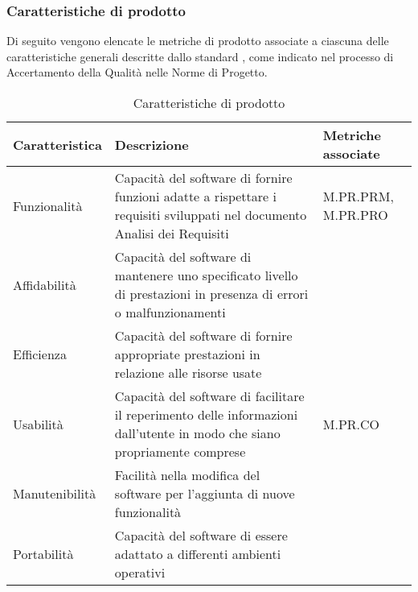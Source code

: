 \subsubsection{Caratteristiche di prodotto}
Di seguito vengono elencate le metriche di prodotto associate a ciascuna delle caratteristiche generali descritte dallo standard , 
come indicato nel processo di Accertamento della Qualità nelle Norme di Progetto.
\begin{table}[H]
    \centering
    \begin{tabularx}{\textwidth}{| X | X | X |}
    \hline
        \textbf{Caratteristica} & 
        \textbf{Descrizione} &
        \textbf{Metriche associate}\\
    \hline
        Funzionalità & Capacità del software di fornire funzioni adatte a rispettare i requisiti sviluppati nel documento Analisi dei Requisiti & M.PR.PRM, M.PR.PRO \\
    \hline
        Affidabilità & Capacità del software di mantenere uno specificato livello di prestazioni in presenza di errori o malfunzionamenti & \\
    \hline
        Efficienza & Capacità del software di fornire appropriate prestazioni in relazione alle risorse usate & \\
    \hline
        Usabilità & Capacità del software di facilitare il reperimento delle informazioni dall'utente in modo che siano propriamente comprese & M.PR.CO \\
    \hline
        Manutenibilità & Facilità nella modifica del software per l'aggiunta di nuove funzionalità & \\
    \hline
        Portabilità & Capacità del software di essere adattato a differenti ambienti operativi & \\
    \hline
    \end{tabularx}
    \caption{Caratteristiche di prodotto}
    \label{tab:caratteristiche_prodotto} 
\end{table}





